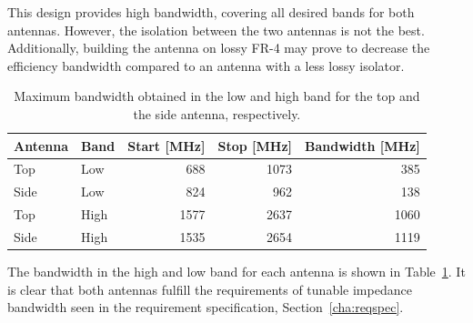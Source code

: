 This design provides high bandwidth, covering all desired bands for both antennas. However, the isolation between the two antennas is not the best. Additionally, building the antenna on lossy FR-4 may prove to decrease the efficiency bandwidth compared to an antenna with a less lossy isolator.

\begin{table}[htbp]
    \centering
    \begin{tabular}{|l|l|r|r|r|}
        \hline
        Antenna & Band & Start [MHz] & Stop [MHz] & Bandwidth [MHz] \\
        \hline
        Top     & Low  & 688         & 1073       & 385 \\
        Side    & Low  & 824         & 962        & 138 \\
        \hline
        Top     & High & 1577        & 2637       & 1060 \\
        Side    & High & 1535        & 2654       & 1119 \\
        \hline
    \end{tabular}
    \caption{Maximum bandwidth obtained in the low and high band for the top and the side antenna, respectively.}
    \label{tab:bw_sol2}
\end{table}

The bandwidth in the high and low band for each antenna is shown in Table~\ref{tab:bw_sol2}. It is clear that both antennas fulfill the requirements of tunable impedance bandwidth seen in the requirement specification, Section~\ref{cha:reqspec}.

